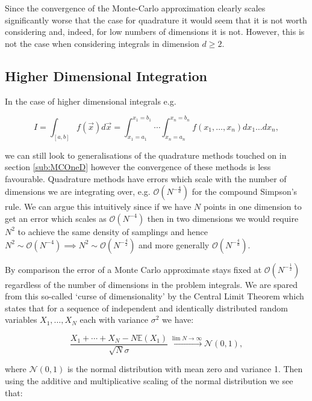 	Since the convergence of the Monte-Carlo approximation clearly scales significantly worse that the case for quadrature it would seem
	that it is not worth considering and, indeed, for low numbers of dimensions it is not. However, this is not the case when considering
	integrals in dimension $d\geq2$.

\subsection{Higher Dimensional Integration}
\label{sub:MCND}

	In the case of higher dimensional integrals e.g.

	\begin{equation}
		I = \int_{[a, b]}f(\vec{x})d\vec{x} = \int_{x_1=a_1}^{x_1=b_1}\cdots\int_{x_n=a_n}^{x_n=b_n}f(x_1, \ldots, x_n)dx_1\ldots dx_n,
	\end{equation}

	we can still look to generalisations of the quadrature methods touched on in section \ref{sub:MCOneD} however the convergence of
	these methods is less favourable.  Quadrature methods have errors which scale with the number of dimensions we are integrating over,
	e.g. $\mathcal{O}(N^{-\frac{4}{d}})$ for the compound Simpson's rule.  We can argue this intuitively since if we have $N$ points in one
	dimension to get an error which scales as $\mathcal{O}(N^{-4})$ then in two dimensions we would require $N^2$ to achieve
	the same density of samplings and hence $N^2\sim\mathcal{O}(N^{-4})\implies N^2\sim\mathcal{O}(N^{-\frac{4}{2}})$ and more generally
	$\mathcal{O}(N^{-\frac{4}{d}})$.

	By comparison the error of a Monte Carlo approximate stays fixed at $\mathcal{O}(N^{-\frac{1}{2}})$ regardless of the number of
	dimensions in the problem integrals.  We are spared from this so-called `curse of dimensionality' by the Central Limit Theorem
	which states that for a sequence of independent and identically distributed random variables $X_1, \ldots, X_N$ each with
	variance $\sigma^2$ we have:

	\begin{equation}
		\frac{X_1 + \cdots + X_N - N\mathbb{E}(X_1)}{\sqrt{N}\sigma}\xrightarrow{\lim{N\rightarrow\infty}}\mathcal{N}(0, 1),
	\end{equation}

	where $\mathcal{N}(0, 1)$ is the normal distribution with mean zero and variance 1.  Then using the additive and multiplicative scaling
	of the normal distribution we see that:

